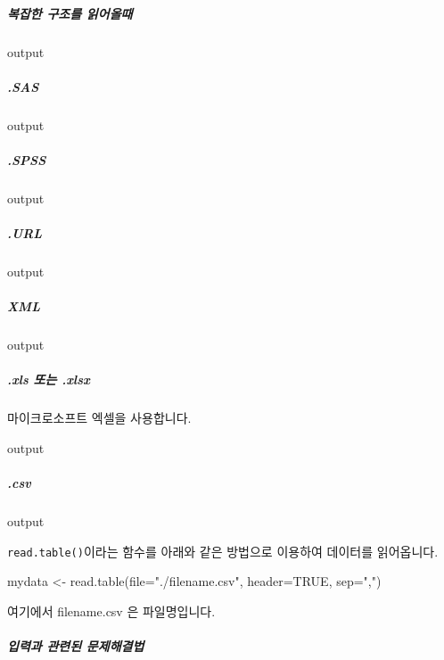 \documentclass{book}
\begin{document}
\subparagraph{복잡한 구조를 읽어올때}
\begin{Schunk}
\begin{Soutput}
output
\end{Soutput}
\end{Schunk}

\subparagraph{.SAS}
\begin{Schunk}
\begin{Soutput}
output
\end{Soutput}
\end{Schunk}

\subparagraph{.SPSS}
\begin{Schunk}
\begin{Soutput}
output
\end{Soutput}
\end{Schunk}

\subparagraph{.URL}
\begin{Schunk}
\begin{Soutput}
output
\end{Soutput}
\end{Schunk}

\subparagraph{XML}
\begin{Schunk}
\begin{Soutput}
output
\end{Soutput}
\end{Schunk}

\subparagraph{.xls 또는 .xlsx}
마이크로소프트 엑셀을 사용합니다. 
\begin{Schunk}
\begin{Soutput}
output
\end{Soutput}
\end{Schunk}

\subparagraph{.csv}
\begin{Schunk}
\begin{Soutput}
output
\end{Soutput}
\end{Schunk}

\texttt{read.table()}이라는 함수를 아래와 같은 방법으로 이용하여 데이터를 읽어옵니다.

\begin{Schunk}
\begin{Soutput}
mydata <- read.table(file="./filename.csv", header=TRUE, sep=",")
\end{Soutput}
\end{Schunk}

여기에서 filename.csv 은 파일명입니다.

\subparagraph{입력과 관련된 문제해결법}
\end{document}

